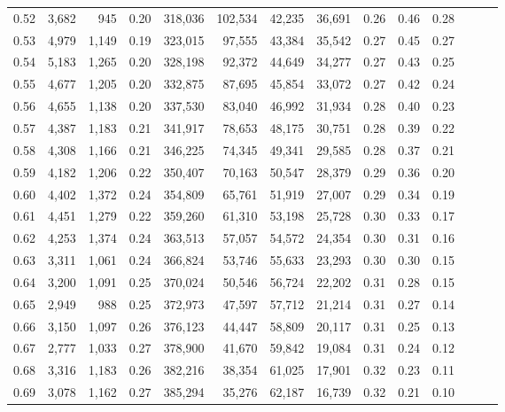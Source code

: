 \begin{tabular}{rrrrrrrrrrrrrr}
0.52 &   3,682 &    945 &  0.20 &  318,036 &  102,534 &  42,235 &  36,691 &  0.26 &  0.46 &      0.28 \\
0.53 &   4,979 &  1,149 &  0.19 &  323,015 &   97,555 &  43,384 &  35,542 &  0.27 &  0.45 &      0.27 \\
0.54 &   5,183 &  1,265 &  0.20 &  328,198 &   92,372 &  44,649 &  34,277 &  0.27 &  0.43 &      0.25 \\
0.55 &   4,677 &  1,205 &  0.20 &  332,875 &   87,695 &  45,854 &  33,072 &  0.27 &  0.42 &      0.24 \\
0.56 &   4,655 &  1,138 &  0.20 &  337,530 &   83,040 &  46,992 &  31,934 &  0.28 &  0.40 &      0.23 \\
0.57 &   4,387 &  1,183 &  0.21 &  341,917 &   78,653 &  48,175 &  30,751 &  0.28 &  0.39 &      0.22 \\
0.58 &   4,308 &  1,166 &  0.21 &  346,225 &   74,345 &  49,341 &  29,585 &  0.28 &  0.37 &      0.21 \\
0.59 &   4,182 &  1,206 &  0.22 &  350,407 &   70,163 &  50,547 &  28,379 &  0.29 &  0.36 &      0.20 \\
0.60 &   4,402 &  1,372 &  0.24 &  354,809 &   65,761 &  51,919 &  27,007 &  0.29 &  0.34 &      0.19 \\
0.61 &   4,451 &  1,279 &  0.22 &  359,260 &   61,310 &  53,198 &  25,728 &  0.30 &  0.33 &      0.17 \\
0.62 &   4,253 &  1,374 &  0.24 &  363,513 &   57,057 &  54,572 &  24,354 &  0.30 &  0.31 &      0.16 \\
0.63 &   3,311 &  1,061 &  0.24 &  366,824 &   53,746 &  55,633 &  23,293 &  0.30 &  0.30 &      0.15 \\
0.64 &   3,200 &  1,091 &  0.25 &  370,024 &   50,546 &  56,724 &  22,202 &  0.31 &  0.28 &      0.15 \\
0.65 &   2,949 &    988 &  0.25 &  372,973 &   47,597 &  57,712 &  21,214 &  0.31 &  0.27 &      0.14 \\
0.66 &   3,150 &  1,097 &  0.26 &  376,123 &   44,447 &  58,809 &  20,117 &  0.31 &  0.25 &      0.13 \\
0.67 &   2,777 &  1,033 &  0.27 &  378,900 &   41,670 &  59,842 &  19,084 &  0.31 &  0.24 &      0.12 \\
0.68 &   3,316 &  1,183 &  0.26 &  382,216 &   38,354 &  61,025 &  17,901 &  0.32 &  0.23 &      0.11 \\
0.69 &   3,078 &  1,162 &  0.27 &  385,294 &   35,276 &  62,187 &  16,739 &  0.32 &  0.21 &      0.10 \\

\end{tabular}
